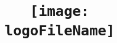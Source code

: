 \title{
	{\thesisTitle}\\
	{\large \institution}\\
	{\texttt{[image: \\logoFileName]} }
}
\author{\name}

\maketitle
